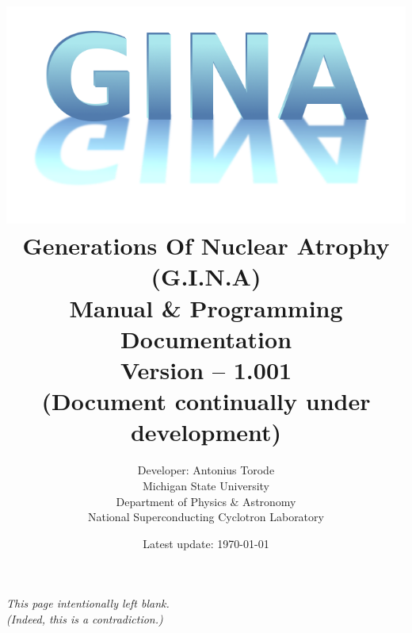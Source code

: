 \documentclass[openany,a4paper,11pt]{book}
\title{\includegraphics[scale =0.5]{./Images/gina.png} \\ Generations Of Nuclear Atrophy (G.I.N.A) \\  Manual \& Programming Documentation \\ Version -- 1.001 \\ (Document continually under development) \\ \vspace{1cm}  
}
\author{Developer: Antonius Torode \\ Michigan State University \\ Department of Physics \& Astronomy \\ National Superconducting Cyclotron Laboratory}
\date{Latest update: \today}
\begin{document}
\frontmatter
\maketitle

\tableofcontents
\newpage
\vspace*{\fill}
\begin{center}
	\textit{This page intentionally left blank. \\ (Indeed, this is a contradiction.)}
\end{center}
\vspace*{\fill}

\mainmatter
\pagestyle{fancy}
\fancyhf{}
\fancyhead[RO, LE]{\thepage}







\backmatter


\end{document}
